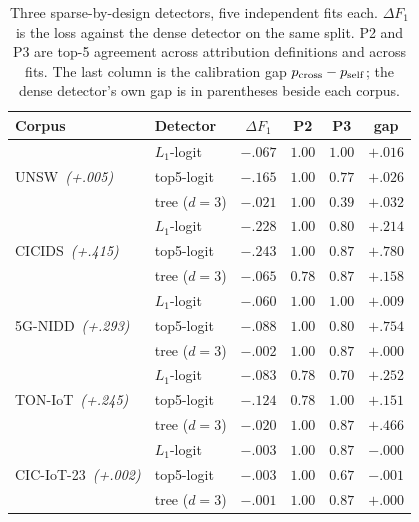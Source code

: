 \documentclass[conference]{IEEEtran}
\begin{document}
\begin{table}[h]
\centering
\caption{Three sparse-by-design detectors, five independent fits each. $\Delta F_1$ is the loss
against the dense detector on the same split. P2 and P3 are top-5 agreement across attribution
definitions and across fits. The last column is the calibration gap $p_{\rm cross}-p_{\rm self}$;
the dense detector's own gap is in parentheses beside each corpus.}
\label{tab:sparse}
\footnotesize\setlength{\tabcolsep}{2.5pt}
\begin{tabular}{@{}llcccc@{}}
\toprule
Corpus & Detector & $\Delta F_1$ & P2 & P3 & gap \\
\midrule
\multirow{3}{*}{UNSW\ \emph{(+.005)}}
 & $L_1$-logit & $-.067$ & $1.00$ & $1.00$ & $+.016$ \\
 & top5-logit  & $-.165$ & $1.00$ & $0.77$ & $+.026$ \\
 & tree ($d{=}3$) & $-.021$ & $1.00$ & $\mathbf{0.39}$ & $+.032$ \\
\midrule
\multirow{3}{*}{CICIDS\ \emph{(+.415)}}
 & $L_1$-logit & $-.228$ & $1.00$ & $0.80$ & $+.214$ \\
 & top5-logit  & $-.243$ & $1.00$ & $0.87$ & $\mathbf{+.780}$ \\
 & tree ($d{=}3$) & $-.065$ & $0.78$ & $0.87$ & $+.158$ \\
\midrule
\multirow{3}{*}{5G-NIDD\ \emph{(+.293)}}
 & $L_1$-logit & $-.060$ & $1.00$ & $1.00$ & $+.009$ \\
 & top5-logit  & $-.088$ & $1.00$ & $0.80$ & $\mathbf{+.754}$ \\
 & tree ($d{=}3$) & $-.002$ & $1.00$ & $0.87$ & $\mathbf{+.000}$ \\
\midrule
\multirow{3}{*}{TON-IoT\ \emph{(+.245)}}
 & $L_1$-logit & $-.083$ & $0.78$ & $0.70$ & $+.252$ \\
 & top5-logit  & $-.124$ & $0.78$ & $1.00$ & $+.151$ \\
 & tree ($d{=}3$) & $-.020$ & $1.00$ & $0.87$ & $\mathbf{+.466}$ \\
\midrule
\multirow{3}{*}{CIC-IoT-23\ \emph{(+.002)}}
 & $L_1$-logit & $-.003$ & $1.00$ & $0.87$ & $-.000$ \\
 & top5-logit  & $-.003$ & $1.00$ & $0.67$ & $-.001$ \\
 & tree ($d{=}3$) & $-.001$ & $1.00$ & $0.87$ & $+.000$ \\
\bottomrule
\end{tabular}
\end{table}

\end{document}
